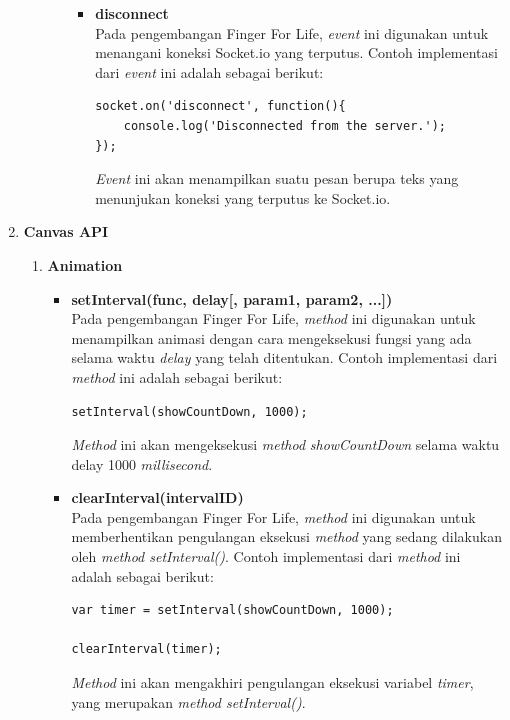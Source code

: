 \begin{enumerate}
\begin{enumerate}
\begin{enumerate}
\begin{itemize}
				\item \textbf{disconnect} \\
				Pada pengembangan Finger For Life, \textit{event} ini digunakan untuk menangani koneksi Socket.io yang terputus. Contoh implementasi dari \textit{event} ini adalah sebagai berikut:
\begin{lstlisting}[caption={Implementasi \textit{event disconnect} pada \textit{client} }]
socket.on('disconnect', function(){
	console.log('Disconnected from the server.');
});
\end{lstlisting}
				\textit{Event} ini akan menampilkan suatu pesan berupa teks yang menunjukan koneksi yang terputus ke Socket.io.

			\end{itemize}
		\end{enumerate}
	\end{enumerate}
	
	\item \textbf{Canvas API}
	\begin{enumerate}
		\item \textbf{Animation}
		\begin{itemize}
			\item \textbf{setInterval(func, delay[, param1, param2, ...])} \\
			Pada pengembangan Finger For Life, \textit{method} ini digunakan untuk menampilkan animasi dengan cara mengeksekusi fungsi yang ada selama waktu \textit{delay} yang telah ditentukan. Contoh implementasi dari \textit{method} ini adalah sebagai berikut:
\begin{lstlisting}[caption={Implementasi \textit{method setInterval()}}]
setInterval(showCountDown, 1000);
\end{lstlisting}
\textit{Method} ini akan mengeksekusi \textit{method} \textit{showCountDown} selama waktu delay 1000 \textit{millisecond}.
			
			\item \textbf{clearInterval(intervalID)} \\
			Pada pengembangan Finger For Life, \textit{method} ini digunakan untuk memberhentikan pengulangan eksekusi \textit{method} yang sedang dilakukan oleh \textit{method setInterval()}. Contoh implementasi dari \textit{method} ini adalah sebagai berikut:
\begin{lstlisting}[caption={Implementasi \textit{method clearInterval()}}]
var timer = setInterval(showCountDown, 1000);

clearInterval(timer);
\end{lstlisting}
			\textit{Method} ini akan mengakhiri pengulangan eksekusi variabel \textit{timer}, yang merupakan \textit{method setInterval()}.			
			

\end{itemize}
\end{enumerate}
\end{enumerate}
